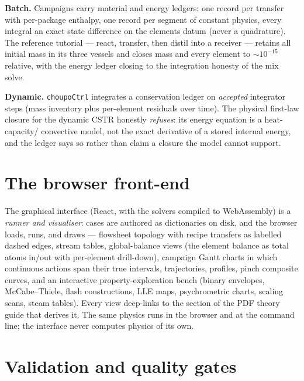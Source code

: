 \documentclass[11pt,a4paper]{article}
\newcommand{\code}[1]{\texttt{#1}}
\begin{document}
\textbf{Batch.}  Campaigns carry material and energy ledgers: one record
per transfer with per-package enthalpy, one record per segment of
constant physics, every integral an exact state difference on the
elements datum (never a quadrature).  The reference tutorial --- react,
transfer, then distil into a receiver --- retains all initial mass in
its three vessels and closes mass and every element to $\sim\!10^{-15}$
relative, with the energy ledger closing to the integration honesty of
the mix solve.

\textbf{Dynamic.}  \code{choupoCtrl} integrates a conservation ledger on
\emph{accepted} integrator steps (mass inventory plus per-element
residuals over time).  The physical first-law closure for the dynamic
CSTR honestly \emph{refuses}: its energy equation is a heat-capacity/
convective model, not the exact derivative of a stored internal energy,
and the ledger says so rather than claim a closure the model cannot
support.

\section{The browser front-end}

The graphical interface (React, with the solvers compiled to WebAssembly)
is a \emph{runner and visualiser}: cases are authored as dictionaries on
disk, and the browser loads, runs, and draws --- flowsheet topology with
recipe transfers as labelled dashed edges, stream tables, global-balance
views (the element balance as total atoms in/out with per-element
drill-down), campaign Gantt charts in which continuous actions span their
true intervals, trajectories, profiles, pinch composite curves, and an
interactive property-exploration bench (binary envelopes,
McCabe--Thiele, flash constructions, LLE maps, psychrometric charts,
scaling scans, steam tables).  Every view deep-links to the section of
the PDF theory guide that derives it.  The same physics runs in the
browser and at the command line; the interface never computes physics of
its own.

\section{Validation and quality gates}
\end{document}
